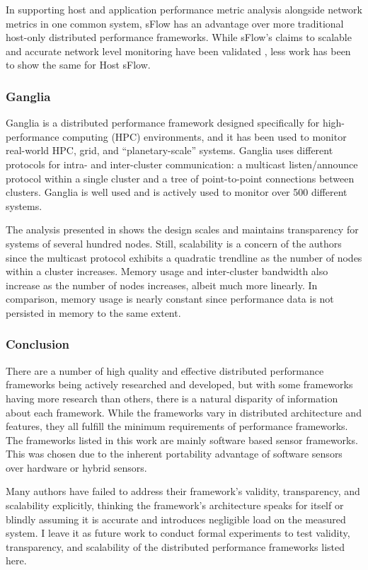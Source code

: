 In supporting host and application performance metric analysis alongside network metrics in one common system, sFlow has
an advantage over more traditional host-only distributed performance frameworks. While sFlow's claims to scalable and
accurate network level monitoring have been validated \cite{needed}, less work has been to show the same for Host sFlow.
\cite{needed}

\subsubsection{Ganglia}

Ganglia is a distributed performance framework designed specifically for high-performance computing (HPC) environments,
and it has been used to monitor real-world HPC, grid, and ``planetary-scale'' systems. Ganglia uses different protocols
for intra- and inter-cluster communication: a multicast listen/announce protocol within a single cluster and a tree of
point-to-point connections between clusters. Ganglia is well used and is actively used to monitor over 500 different
systems. \cite{ganglia}

The analysis presented in \cite{ganglia} shows the design scales and maintains transparency for systems of several
hundred nodes. Still, scalability is a concern of the authors since the multicast protocol exhibits a quadratic
trendline as the number of nodes within a cluster increases. Memory usage and inter-cluster bandwidth also increase as
the number of nodes increases, albeit much more linearly. In comparison, \dcamp memory usage is nearly constant since
performance data is not persisted in memory to the same extent.

\subsubsection{Conclusion}

There are a number of high quality and effective distributed performance frameworks being actively researched and
developed, but with some frameworks having more research than others, there is a natural disparity of information about
each framework. While the frameworks vary in distributed architecture and features, they all fulfill the minimum
requirements of performance frameworks. The frameworks listed in this work are mainly software based sensor frameworks.
This was chosen due to the inherent portability advantage of software sensors over hardware or hybrid sensors.

Many authors have failed to address their framework's validity, transparency, and scalability explicitly, thinking the
framework's architecture speaks for itself or blindly assuming it is accurate and introduces negligible load on the
measured system. I leave it as future work to conduct formal experiments to test validity, transparency, and scalability
of the distributed performance frameworks listed here.
